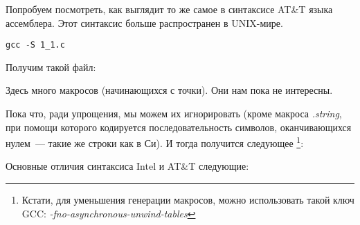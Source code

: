 Попробуем посмотреть, как выглядит то же самое в синтаксисе AT\&T языка ассемблера.
Этот синтаксис больше распространен в UNIX-мире.

\begin{lstlisting}[caption=компилируем в GCC 4.7.3]
gcc -S 1_1.c
\end{lstlisting}

Получим такой файл:



Здесь много макросов (начинающихся с точки). Они нам пока не интересны.

Пока что, ради упрощения, мы можем 
их игнорировать (кроме макроса \emph{.string}, при помощи которого кодируется последовательность символов, 
оканчивающихся нулем~--- такие же строки как в Си). И тогда получится следующее
\footnote{Кстати, для уменьшения генерации  макросов, можно использовать такой ключ GCC: \emph{-fno-asynchronous-unwind-tables}}:



\myindex{\ATTSyntax}
\myindex{\IntelSyntax}
Основные отличия синтаксиса Intel и AT\&T следующие:

